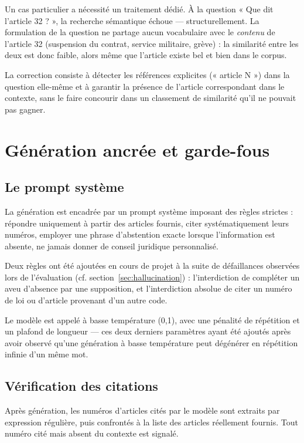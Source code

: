 Un cas particulier a nécessité un traitement dédié. À la question « Que dit l'article 32 ? », la
recherche sémantique échoue --- structurellement. La formulation de la question ne partage aucun
vocabulaire avec le \emph{contenu} de l'article 32 (suspension du contrat, service militaire,
grève) : la similarité entre les deux est donc faible, alors même que l'article existe bel et
bien dans le corpus.

La correction consiste à détecter les références explicites (« article N ») dans la question
elle-même et à garantir la présence de l'article correspondant dans le contexte, sans le faire
concourir dans un classement de similarité qu'il ne pouvait pas gagner.

\section{Génération ancrée et garde-fous}

\subsection{Le prompt système}

La génération est encadrée par un prompt système imposant des règles strictes : répondre
uniquement à partir des articles fournis, citer systématiquement leurs numéros, employer une
phrase d'abstention exacte lorsque l'information est absente, ne jamais donner de conseil
juridique personnalisé.

Deux règles ont été ajoutées en cours de projet à la suite de défaillances observées lors de
l'évaluation (cf. section~\ref{sec:hallucination}) : l'interdiction de compléter un aveu
d'absence par une supposition, et l'interdiction absolue de citer un numéro de loi ou d'article
provenant d'un autre code.

Le modèle est appelé à basse température (0{,}1), avec une pénalité de répétition et un plafond
de longueur --- ces deux derniers paramètres ayant été ajoutés après avoir observé qu'une
génération à basse température peut dégénérer en répétition infinie d'un même mot.

\subsection{Vérification des citations}

Après génération, les numéros d'articles cités par le modèle sont extraits par expression
régulière, puis confrontés à la liste des articles réellement fournis. Tout numéro cité mais
absent du contexte est signalé.

